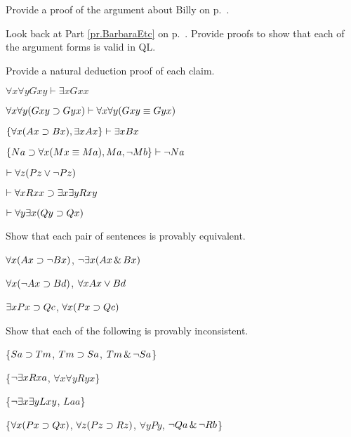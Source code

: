 \problempart
Provide a proof of the argument about Billy on p.~\pageref{surgeon2}.



\problempart
\label{pr.BarbaraEtc.proof1}
Look back at Part \ref{pr.BarbaraEtc} on p.~\pageref{pr.BarbaraEtc}. Provide proofs to show that each of the argument forms is valid in QL.




\solutions
\problempart
\label{pr.QLproofsNDe}
Provide a natural deduction proof of each claim.
\begin{earg}
\item $\forall x \forall y Gxy\vdash\exists x Gxx$
\item $\forall x \forall y (Gxy \supset Gyx) \vdash \forall x\forall y (Gxy \equiv Gyx)$
\item $\{\forall x(Ax\supset Bx), \exists x Ax\} \vdash \exists x Bx$
\item $\{Na \supset \forall x(Mx \equiv Ma), Ma, \neg Mb\}\vdash \neg Na$
\item $\vdash\forall z (Pz \vee \neg Pz)$
\item $\vdash\forall x Rxx\supset \exists x \exists y Rxy$
\item $\vdash\forall y \exists x (Qy \supset Qx)$
\end{earg}



\problempart
Show that each pair of sentences is provably equivalent.
\begin{earg}
\item $\forall x (Ax\supset \neg Bx)$, $\neg\exists x(Ax \,\&\, Bx)$
\item $\forall x (\neg Ax\supset Bd)$, $\forall x Ax \vee Bd$
\item $\exists x Px \supset Qc$, $\forall x (Px \supset Qc)$
\end{earg}



\problempart
Show that each of the following is provably inconsistent.
\begin{earg}
\item \{$Sa\supset Tm$, $Tm \supset Sa$, $Tm \,\&\, \neg Sa$\}
\item \{$\neg\exists x Rxa$, $\forall x \forall y Ryx$\}
\item \{$\neg\exists x \exists y Lxy$, $Laa$\}
\item \{$\forall x(Px \supset Qx)$, $\forall z(Pz \supset Rz)$, $\forall y Py$, $\neg Qa \,\&\, \neg Rb$\}
\end{earg}



